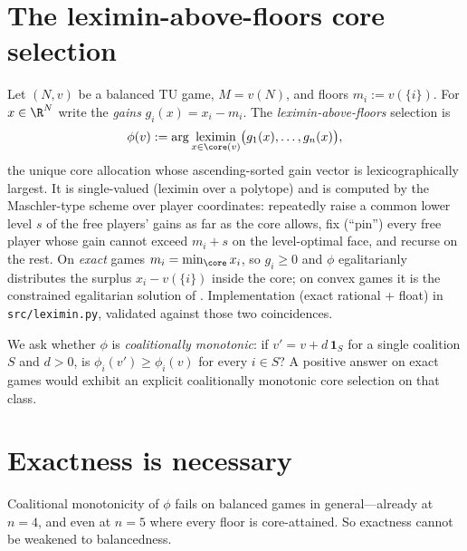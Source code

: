 
\section{The leximin-above-floors core selection}\label{sec:lx-def}

Let $(N,v)$ be a balanced TU game, $M=v(N)$, and floors $m_i:=v(\{i\})$. For
$x\in\R^N$ write the \emph{gains} $g_i(x)=x_i-m_i$. The
\emph{leximin-above-floors} selection is
\[
  \phi(v):=\arg\operatorname*{leximin}_{x\in\core(v)}\bigl(g_1(x),\dots,g_n(x)\bigr),
\]
the unique core allocation whose ascending-sorted gain vector is
lexicographically largest. It is single-valued (leximin over a polytope) and is
computed by the Maschler-type scheme over player coordinates: repeatedly raise a
common lower level $s$ of the free players' gains as far as the core allows, fix
(``pin'') every free player whose gain cannot exceed $m_i+s$ on the level-optimal
face, and recurse on the rest. On \emph{exact} games $m_i=\min_{\core}x_i$, so
$g_i\ge 0$ and $\phi$ egalitarianly distributes the surplus $x_i-v(\{i\})$ inside
the core; on convex games it is the constrained egalitarian solution of
\citet{DuttaRay89}. Implementation (exact rational + float) in
\texttt{src/leximin.py}, validated against those two coincidences.

We ask whether $\phi$ is \emph{coalitionally monotonic}: if $v'=v+d\,\mathbf 1_S$
for a single coalition $S$ and $d>0$, is $\phi_i(v')\ge\phi_i(v)$ for every
$i\in S$? A positive answer on exact games would exhibit an explicit coalitionally
monotonic core selection on that class.


\section{Exactness is necessary}\label{sec:lx-necessity}

Coalitional monotonicity of $\phi$ fails on balanced games in general---already at
$n=4$, and even at $n=5$ where every floor is core-attained. So exactness cannot be
weakened to balancedness.

